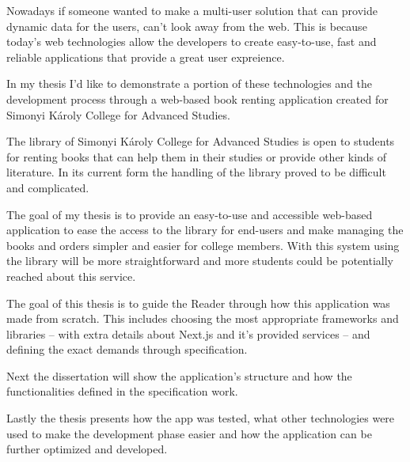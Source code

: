Nowadays if someone wanted to make a multi-user solution that can provide dynamic data for the users, can't look away from the web.
This is because today's web technologies allow the developers to create easy-to-use, fast and reliable applications that provide a great user expreience.

In my thesis I'd like to demonstrate a portion of these technologies and the development process through a web-based book renting application
created for Simonyi Károly College for Advanced Studies.

The library of Simonyi Károly College for Advanced Studies is open to students for renting books that can help them in their
studies or provide other kinds of literature. In its current form the handling of the library proved to be difficult and complicated.

The goal of my thesis is to provide an easy-to-use and accessible web-based application to ease the access to the library for end-users
and make managing the books and orders simpler and easier for college members. With this system using the library will be more straightforward
and more students could be potentially reached about this service.

The goal of this thesis is to guide the Reader through how this application was made from scratch. This includes choosing the
most appropriate frameworks and libraries -- with extra details about Next.js and it's provided services -- and defining the
exact demands through specification.

Next the dissertation will show the application's structure and how the functionalities defined in the specification work.

Lastly the thesis presents how the app was tested, what other technologies were used to make the development phase easier and how
the application can be further optimized and developed.

\vfill
\selectthesislanguage

\setcounter{romanPage}{\value{page}}
